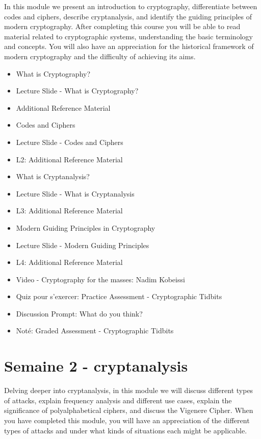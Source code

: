 In this module we present an introduction to cryptography, differentiate between codes and ciphers, describe cryptanalysis, and identify the guiding principles of modern cryptography. After completing this course you will be able to read material related to cryptographic systems, understanding the basic terminology and concepts. You will also have an appreciation for the historical framework of modern cryptography and the difficulty of achieving its aims.

\begin{itemize}[label={$\bullet$}]
    \item What is Cryptography?
    \item Lecture Slide - What is Cryptography?
    \item Additional Reference Material
    \item Codes and Ciphers
    \item Lecture Slide - Codes and Ciphers
    \item L2: Additional Reference Material
    \item What is Cryptanalysis?
    \item Lecture Slide - What is Cryptanalysis
    \item L3: Additional Reference Material
    \item Modern Guiding Principles in Cryptography
    \item Lecture Slide - Modern Guiding Principles
    \item L4: Additional Reference Material
    \item Video - Cryptography for the masses: Nadim Kobeissi
    \item Quiz pour s'exercer: Practice Assessment - Cryptographic Tidbits
    \item Discussion Prompt: What do you think?

    \item Noté: Graded Assessment - Cryptographic Tidbits
\end{itemize}

\newpage



\section*{Semaine 2 - cryptanalysis}



Delving deeper into cryptanalysis, in this module we will discuss different types of attacks, explain frequency analysis and different use cases, explain the significance of polyalphabetical ciphers, and discuss the Vigenere Cipher. When you have completed this module, you will have an appreciation of the different types of attacks and under what kinds of situations each might be applicable.

